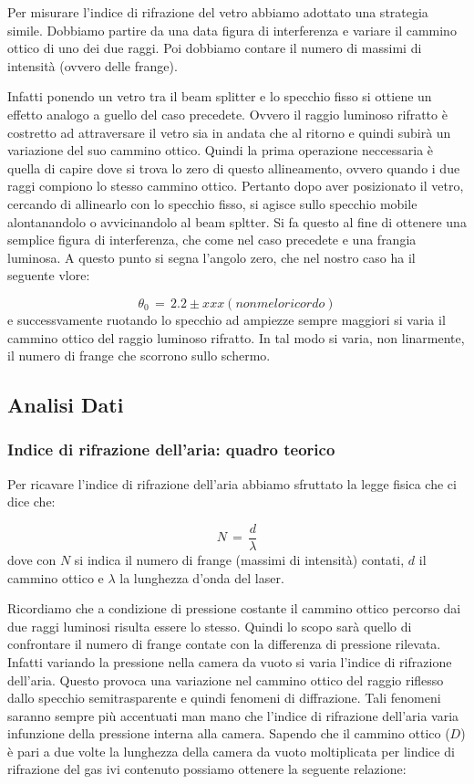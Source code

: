 Per misurare l'indice di rifrazione del vetro abbiamo adottato una strategia simile. Dobbiamo partire da una data figura di interferenza e variare il cammino ottico di uno dei due raggi. Poi dobbiamo contare il numero di massimi di intensità (ovvero delle frange).

Infatti ponendo un vetro tra il beam splitter e lo specchio fisso si ottiene un effetto analogo a guello del caso precedete. Ovvero il raggio luminoso rifratto è costretto ad attraversare il vetro sia in andata che al ritorno e quindi subirà un variazione del suo cammino ottico.
Quindi la prima operazione neccessaria è quella di capire dove si trova lo zero di questo allineamento, ovvero quando i due raggi compiono lo stesso cammino ottico. Pertanto dopo aver posizionato il vetro, cercando di allinearlo con lo specchio fisso, si agisce sullo specchio mobile alontanandolo o avvicinandolo al beam spltter. Si fa questo al fine di ottenere una semplice figura di interferenza, che come nel caso precedete e una frangia luminosa.
A questo punto si segna l'angolo zero, che nel nostro caso ha il seguente vlore:

\begin{equation}
	\theta_0 \,=\, 2.2 \pm xxx (nonmeloricordo)
\end{equation}
%
e successvamente ruotando lo specchio ad ampiezze sempre maggiori si varia il cammino ottico del raggio luminoso rifratto. In tal modo si varia, non linarmente, il numero di frange che scorrono sullo schermo.

\subsection{Analisi Dati}

\subsubsection{Indice di rifrazione dell'aria: quadro teorico}

Per ricavare l'indice di rifrazione dell'aria abbiamo sfruttato la legge fisica che ci dice che:

\begin{equation}
	N \,=\, \frac{d}{\lambda}
\end{equation}
%
dove con $N$  si indica il numero di frange (massimi di intensità) contati, $d$ il cammino ottico e $\lambda$ la lunghezza d'onda del laser.

Ricordiamo che a condizione di pressione costante il cammino ottico percorso dai due raggi luminosi risulta essere lo stesso.
Quindi lo scopo sarà quello di confrontare il numero di frange contate con la differenza di pressione rilevata. Infatti variando la pressione nella camera da vuoto si varia l'indice di rifrazione dell'aria. Questo provoca una variazione nel cammino ottico del raggio riflesso dallo specchio semitrasparente e quindi fenomeni di diffrazione. Tali fenomeni saranno sempre più accentuati man mano che l'indice di rifrazione dell'aria varia infunzione della pressione interna alla camera.
Sapendo che il cammino ottico ($D$) è pari a due volte la lunghezza della camera da vuoto moltiplicata per lindice di rifrazione del gas ivi contenuto possiamo ottenere la seguente relazione:

